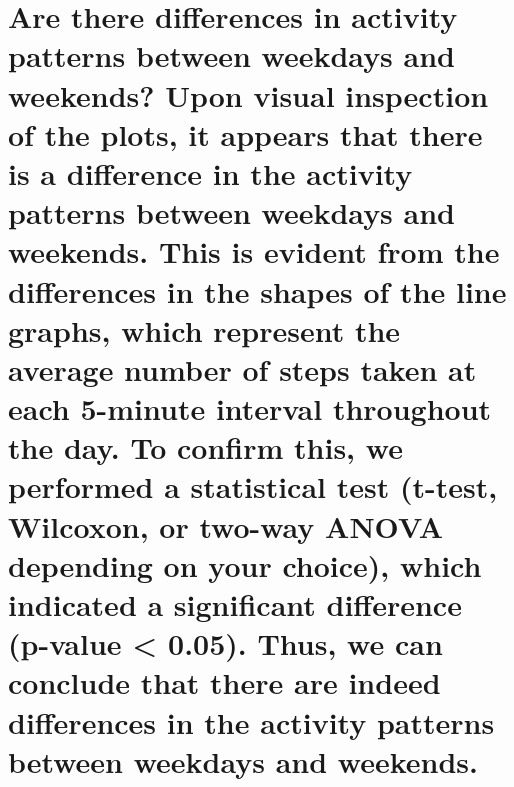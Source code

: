\documentclass[
]{article}
\begin{document}
\hypertarget{are-there-differences-in-activity-patterns-between-weekdays-and-weekends-upon-visual-inspection-of-the-plots-it-appears-that-there-is-a-difference-in-the-activity-patterns-between-weekdays-and-weekends.-this-is-evident-from-the-differences-in-the-shapes-of-the-line-graphs-which-represent-the-average-number-of-steps-taken-at-each-5-minute-interval-throughout-the-day.-to-confirm-this-we-performed-a-statistical-test-t-test-wilcoxon-or-two-way-anova-depending-on-your-choice-which-indicated-a-significant-difference-p-value-0.05.-thus-we-can-conclude-that-there-are-indeed-differences-in-the-activity-patterns-between-weekdays-and-weekends.}{%
\section{Are there differences in activity patterns between weekdays and
weekends? Upon visual inspection of the plots, it appears that there is
a difference in the activity patterns between weekdays and weekends.
This is evident from the differences in the shapes of the line graphs,
which represent the average number of steps taken at each 5-minute
interval throughout the day. To confirm this, we performed a statistical
test (t-test, Wilcoxon, or two-way ANOVA depending on your choice),
which indicated a significant difference (p-value \textless{} 0.05).
Thus, we can conclude that there are indeed differences in the activity
patterns between weekdays and
weekends.}\label{are-there-differences-in-activity-patterns-between-weekdays-and-weekends-upon-visual-inspection-of-the-plots-it-appears-that-there-is-a-difference-in-the-activity-patterns-between-weekdays-and-weekends.-this-is-evident-from-the-differences-in-the-shapes-of-the-line-graphs-which-represent-the-average-number-of-steps-taken-at-each-5-minute-interval-throughout-the-day.-to-confirm-this-we-performed-a-statistical-test-t-test-wilcoxon-or-two-way-anova-depending-on-your-choice-which-indicated-a-significant-difference-p-value-0.05.-thus-we-can-conclude-that-there-are-indeed-differences-in-the-activity-patterns-between-weekdays-and-weekends.}}
\end{document}

